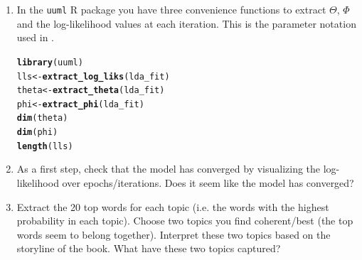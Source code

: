 \documentclass[11pt,a4paper,english]{article}\usepackage[]{graphicx}\usepackage[]{xcolor}
\makeatletter
\newcommand{\hlnum}[1]{\textcolor[rgb]{0.686,0.059,0.569}{#1}}%
\newcommand{\hlsng}[1]{\textcolor[rgb]{0.192,0.494,0.8}{#1}}%
\newcommand{\hlcom}[1]{\textcolor[rgb]{0.678,0.584,0.686}{\textit{#1}}}%
\newcommand{\hldef}[1]{\textcolor[rgb]{0.345,0.345,0.345}{#1}}%
\newcommand{\hlkwb}[1]{\textcolor[rgb]{0.69,0.353,0.396}{#1}}%
\newcommand{\hlkwc}[1]{\textcolor[rgb]{0.333,0.667,0.333}{#1}}%
\newcommand{\hlkwd}[1]{\textcolor[rgb]{0.737,0.353,0.396}{\textbf{#1}}}%
\newenvironment{kframe}{%
 \def\at@end@of@kframe{}%
 \ifinner\ifhmode%
  \def\at@end@of@kframe{\end{minipage}}%
  \begin{minipage}{\columnwidth}%
 \fi\fi%
 \def\FrameCommand##1{\hskip\@totalleftmargin \hskip-\fboxsep
 \colorbox{shadecolor}{##1}\hskip-\fboxsep
     \hskip-\linewidth \hskip-\@totalleftmargin \hskip\columnwidth}%
 \MakeFramed {\advance\hsize-\width
   \@totalleftmargin\z@ \linewidth\hsize
   \@setminipage}}%
 {\par\unskip\endMakeFramed%
 \at@end@of@kframe}
\newenvironment{knitrout}{}{} %
\makeatother
\begin{document}
\begin{enumerate}
\begin{knitrout}\small
{}\color{fgcolor}\begin{kframe}
\begin{alltt}
\hlkwd{library}\hldef{(topicmodels)}
\hldef{K} \hlkwb{<-} \hlnum{10}
\hlcom{# Note: delta is beta in Griffiths and Steyvers (2004) notation.}
\hldef{control} \hlkwb{<-} \hlkwd{list}\hldef{(}\hlkwc{keep} \hldef{=} \hlnum{1}\hldef{,} \hlkwc{delta} \hldef{=} \hlnum{0.1}\hldef{,} \hlkwc{alpha} \hldef{=} \hlnum{1}\hldef{,} \hlkwc{iter} \hldef{=} \hlnum{2000}\hldef{)}
\hlkwd{set.seed}\hldef{(}\hlnum{2026}\hldef{)}
\hldef{lda_fit} \hlkwb{<-} \hlkwd{LDA}\hldef{(m,} \hlkwc{k} \hldef{= K,} \hlkwc{method} \hldef{=} \hlsng{"Gibbs"}\hldef{, control)}
\end{alltt}
\end{kframe}
\end{knitrout}
\item In the \texttt{uuml} R package you have three convenience functions to extract $\Theta$, $\Phi$ and the log-likelihood values at each iteration. This is the parameter notation used in \citet{griffiths2004finding}.
\begin{knitrout}\small
{}\color{fgcolor}\begin{kframe}
\begin{alltt}
\hlkwd{library}\hldef{(uuml)}
\hldef{lls} \hlkwb{<-} \hlkwd{extract_log_liks}\hldef{(lda_fit)}
\hldef{theta} \hlkwb{<-} \hlkwd{extract_theta}\hldef{(lda_fit)}
\hldef{phi} \hlkwb{<-} \hlkwd{extract_phi}\hldef{(lda_fit)}
\hlkwd{dim}\hldef{(theta)}
\hlkwd{dim}\hldef{(phi)}
\hlkwd{length}\hldef{(lls)}
\end{alltt}
\end{kframe}
\end{knitrout}
\item As a first step, check that the model has converged by visualizing the log-likelihood over epochs/iterations. Does it seem like the model has converged?
\item Extract the 20 top words for each topic (i.e. the words with the highest probability in each topic). Choose two topics you find coherent/best (the top words seem to belong together). Interpret these two topics based on the storyline of the book. What have these two topics captured?
\begin{knitrout}\small
{}\color{fgcolor}\begin{kframe}

\end{kframe}
\end{knitrout}
\end{enumerate}
\end{document}
